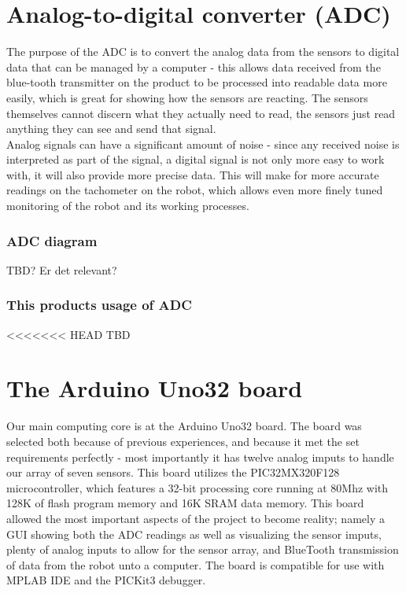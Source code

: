 \section{Analog-to-digital converter (ADC)}

The purpose of the ADC is to convert the analog data from the sensors to digital data that can be managed by a computer - this allows data received from the blue-tooth transmitter on the product to be processed into readable data more easily, which is great for showing how the sensors are reacting. The sensors themselves cannot discern what they actually need to read, the sensors just read anything they can see and send that signal. \\
Analog signals can have a significant amount of noise - since any received noise is interpreted as part of the signal, a digital signal is not only more easy to work with, it will also provide more precise data. This will make for more accurate readings on the tachometer on the robot, which allows even more finely tuned monitoring of the robot and its working processes. \\

\subsubsection{ADC diagram} 
TBD? Er det relevant?

\subsubsection{This products usage of ADC}

<<<<<<< HEAD
TBD

\section{The Arduino Uno32 board}

Our main computing core is at the Arduino Uno32 board. The board was selected both because of previous experiences, and because it met the set requirements perfectly - most importantly it has twelve analog imputs to handle our array of seven sensors. This board utilizes the PIC32MX320F128 microcontroller, which features a 32-bit processing core running at 80Mhz with 128K of flash program memory and 16K SRAM data memory. This board allowed the most important aspects of the project to become reality; namely a GUI showing both the ADC readings as well as visualizing the sensor imputs, plenty of analog inputs to allow for the sensor array, and BlueTooth transmission of data from the robot unto a computer.\newline
The board is compatible for use with MPLAB IDE and the PICKit3 debugger.

